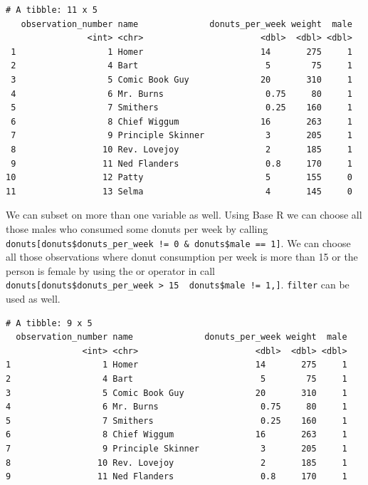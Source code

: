 \documentclass[]{book}
\newenvironment{Shaded}{\begin{snugshade}}{\end{snugshade}}
\newcommand{\DecValTok}[1]{\textcolor[rgb]{0.00,0.00,0.81}{#1}}
\newcommand{\NormalTok}[1]{#1}
\newcommand{\OperatorTok}[1]{\textcolor[rgb]{0.81,0.36,0.00}{\textbf{#1}}}
\newcommand{\StringTok}[1]{\textcolor[rgb]{0.31,0.60,0.02}{#1}}
\begin{document}
\begin{verbatim}
# A tibble: 11 x 5
   observation_number name              donuts_per_week weight  male
                <int> <chr>                       <dbl>  <dbl> <dbl>
 1                  1 Homer                       14       275     1
 2                  4 Bart                         5        75     1
 3                  5 Comic Book Guy              20       310     1
 4                  6 Mr. Burns                    0.75     80     1
 5                  7 Smithers                     0.25    160     1
 6                  8 Chief Wiggum                16       263     1
 7                  9 Principle Skinner            3       205     1
 8                 10 Rev. Lovejoy                 2       185     1
 9                 11 Ned Flanders                 0.8     170     1
10                 12 Patty                        5       155     0
11                 13 Selma                        4       145     0
\end{verbatim}

We can subset on more than one variable as well. Using Base R we can choose all those males who consumed some donuts per week by calling \texttt{donuts{[}donuts\$donuts\_per\_week\ !=\ 0\ \&\ donuts\$male\ ==\ 1{]}}. We can choose all those observations where donut consumption per week is more than 15 or the person is female by using the or operator \textbar{} in call \texttt{donuts{[}donuts\$donuts\_per\_week\ \textgreater{}\ 15\ \textbar{}\ donuts\$male\ !=\ 1,{]}}. \texttt{filter} can be used as well.

\begin{Shaded}
\end{Shaded}

\begin{verbatim}
# A tibble: 9 x 5
  observation_number name              donuts_per_week weight  male
               <int> <chr>                       <dbl>  <dbl> <dbl>
1                  1 Homer                       14       275     1
2                  4 Bart                         5        75     1
3                  5 Comic Book Guy              20       310     1
4                  6 Mr. Burns                    0.75     80     1
5                  7 Smithers                     0.25    160     1
6                  8 Chief Wiggum                16       263     1
7                  9 Principle Skinner            3       205     1
8                 10 Rev. Lovejoy                 2       185     1
9                 11 Ned Flanders                 0.8     170     1
\end{verbatim}
\end{document}
